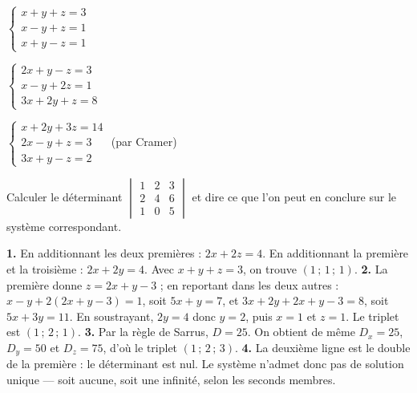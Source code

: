 \begin{entrainement}
\exo[\niveau{1}] $\begin{cases} x+y+z = 3\\ x-y+z = 1\\ x+y-z = 1\end{cases}$

\exo[\niveau{2}] $\begin{cases} 2x+y-z = 3\\ x-y+2z = 1\\ 3x+2y+z = 8\end{cases}$

\exo[\niveau{2}] $\begin{cases} x+2y+3z = 14\\ 2x-y+z = 3\\ 3x+y-z = 2\end{cases}$
\quad (par Cramer)

\exo[\niveau{3}] Calculer le déterminant
$\begin{vmatrix} 1 & 2 & 3\\ 2 & 4 & 6\\ 1 & 0 & 5\end{vmatrix}$
et dire ce que l'on peut en conclure sur le système correspondant.
\end{entrainement}

\begin{corrige}
\textbf{1.} En additionnant les deux premières : $2x+2z = 4$. En additionnant
la première et la troisième : $2x+2y = 4$. Avec $x+y+z = 3$, on trouve
$(1\,;\,1\,;\,1)$.
\textbf{2.} La première donne $z = 2x+y-3$ ; en reportant dans les deux
autres : $x-y+2(2x+y-3) = 1$, soit $5x+y = 7$, et
$3x+2y+2x+y-3 = 8$, soit $5x+3y = 11$. En soustrayant, $2y = 4$ donc
$y = 2$, puis $x = 1$ et $z = 1$. Le triplet est $(1\,;\,2\,;\,1)$.
\textbf{3.} Par la règle de Sarrus, $D = 25$. On obtient de même
$D_{x} = 25$, $D_{y} = 50$ et $D_{z} = 75$, d'où le triplet
$(1\,;\,2\,;\,3)$.
\textbf{4.} La deuxième ligne est le double de la première : le déterminant
est nul. Le système n'admet donc pas de solution unique — soit aucune, soit
une infinité, selon les seconds membres.
\end{corrige}

